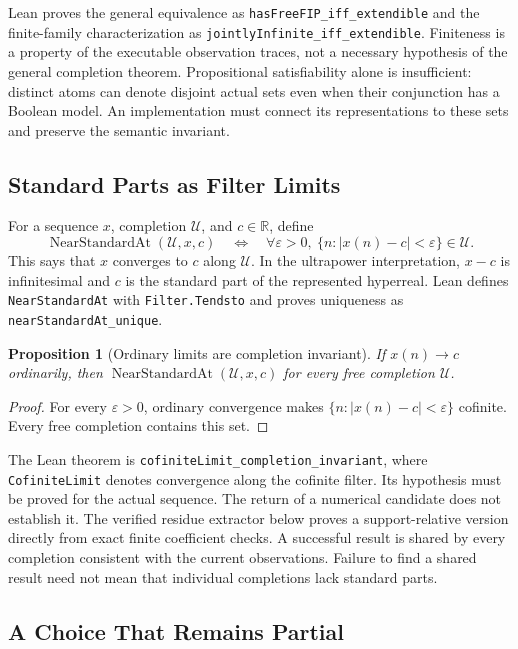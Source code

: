\documentclass[11pt,a4paper]{article}
\theoremstyle{result}
\newtheorem{proposition}{Proposition}
\theoremstyle{definition}
\newcommand{\R}{\mathbb{R}}
\newcommand{\PUF}{\mathcal{U}}
\newcommand{\code}[1]{\texttt{#1}}
\begin{document}
Lean proves the general equivalence as \code{hasFreeFIP\_iff\_extendible} and the finite-family characterization as \code{jointlyInfinite\_iff\_extendible}. Finiteness is a property of the executable observation traces, not a necessary hypothesis of the general completion theorem. Propositional satisfiability alone is insufficient: distinct atoms can denote disjoint actual sets even when their conjunction has a Boolean model. An implementation must connect its representations to these sets and preserve the semantic invariant.

\subsection{Standard Parts as Filter Limits}

For a sequence $x$, completion $\PUF$, and $c\in\R$, define
\[
  \operatorname{NearStandardAt}(\PUF,x,c)
  \quad\Longleftrightarrow\quad
  \forall\varepsilon>0,\ \{n:|x(n)-c|<\varepsilon\}\in\PUF.
\]
This says that $x$ converges to $c$ along $\PUF$. In the ultrapower interpretation, $x-c$ is infinitesimal and $c$ is the standard part of the represented hyperreal. Lean defines \code{NearStandardAt} with \code{Filter.Tendsto} and proves uniqueness as \code{nearStandardAt\_unique}.

\begin{proposition}[Ordinary limits are completion invariant]\label{prop:ordinary-limit}
  If $x(n)\to c$ ordinarily, then $\operatorname{NearStandardAt}(\PUF,x,c)$ for every free completion $\PUF$.
\end{proposition}
\begin{proof}
  For every $\varepsilon>0$, ordinary convergence makes $\{n:|x(n)-c|<\varepsilon\}$ cofinite. Every free completion contains this set.
\end{proof}

The Lean theorem is \code{cofiniteLimit\_completion\_invariant}, where \code{CofiniteLimit} denotes convergence along the cofinite filter. Its hypothesis must be proved for the actual sequence. The return of a numerical candidate does not establish it. The verified residue extractor below proves a support-relative version directly from exact finite coefficient checks. A successful result is shared by every completion consistent with the current observations. Failure to find a shared result need not mean that individual completions lack standard parts.

\subsection{A Choice That Remains Partial}
\end{document}
